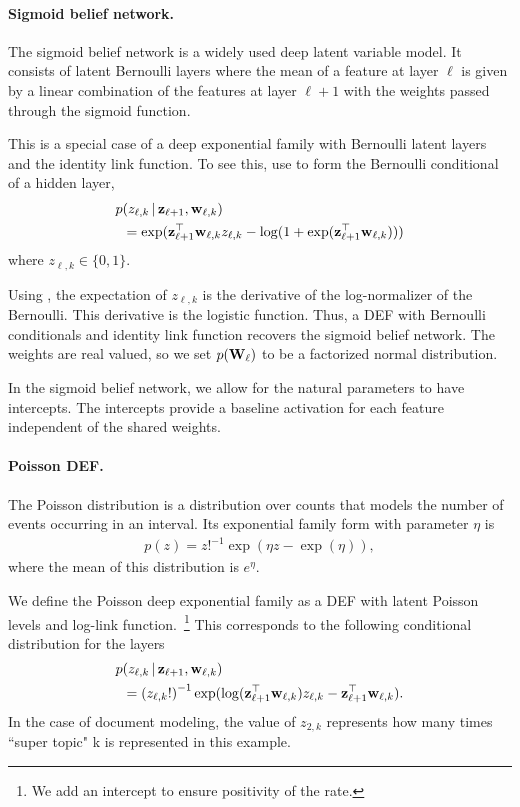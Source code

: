 \documentclass[twoside]{article}
\begin{document}
\paragraph{Sigmoid belief network.}
The sigmoid belief network \citep{Mnih:2014, Neal:1990} is a widely used 
deep latent variable model. It consists of latent Bernoulli
layers where the mean of a feature at layer $\ell$ is given
by a linear combination of the features at layer $\ell+1$ with
the weights passed through the sigmoid function.

This is a special case of a deep exponential family with Bernoulli 
latent layers and the identity link function. To see this,
use  to form the Bernoulli conditional 
of a hidden layer,
\begin{align*}
p&(z_{\ell,k} \,\vert\, \boldsymbol{\mathbf{z}}_{\ell+1}, \boldsymbol{\mathbf{w}}_{\ell, k}) \\
&=  \exp(\boldsymbol{\mathbf{z}}_{\ell+1}^\top \boldsymbol{\mathbf{w}}_{\ell, k} z_{\ell, k} - \log(1 + \exp(\boldsymbol{\mathbf{z}}_{\ell+1}^\top \boldsymbol{\mathbf{w}}_{\ell,k})))
\end{align*}
where $z_{\ell,k} \in \{0,1\}$.

Using , the expectation of $z_{\ell,k}$ is
the derivative of the log-normalizer of the Bernoulli. This derivative is the logistic function. Thus, 
a DEF with Bernoulli conditionals and identity link function recovers the sigmoid belief
network. The weights are real valued, so we set $p(\boldsymbol{\mathbf{W}}_\ell)$ to be a factorized normal distribution.

In the sigmoid belief network, we allow for the natural parameters to have intercepts. The intercepts provide a 
baseline activation for each feature independent of the shared weights.

\paragraph{Poisson DEF.}
The Poisson distribution is a distribution over counts that models
the number of events occurring in an interval. 
Its exponential family form with parameter $\eta$ is
\begin{align*}
p(z) = {z!}^{-1} \exp(\eta z - \exp(\eta)),
\end{align*}
where the mean of this distribution is $e^\eta$.

We define the Poisson deep exponential family 
as a DEF with latent Poisson levels and log-link function.~\footnote{We add an intercept to ensure
positivity of the rate.} 
This corresponds to the following conditional distribution
for the layers
\begin{align*}
p&(z_{\ell,k} \,\vert\, \boldsymbol{\mathbf{z}}_{\ell+1}, \boldsymbol{\mathbf{w}}_{\ell, k}) \\
&= {(z_{\ell,k}!)}^{-1} \exp(\log(\boldsymbol{\mathbf{z}}_{\ell+1}^\top \boldsymbol{\mathbf{w}}_{\ell,k}) z_{\ell,k} - \boldsymbol{\mathbf{z}}_{\ell+1}^\top \boldsymbol{\mathbf{w}}_{\ell,k}).
\end{align*}
In the case of document modeling, the value of $z_{2,k}$ represents how many times ``super topic" k is
represented in this example.
\end{document}
